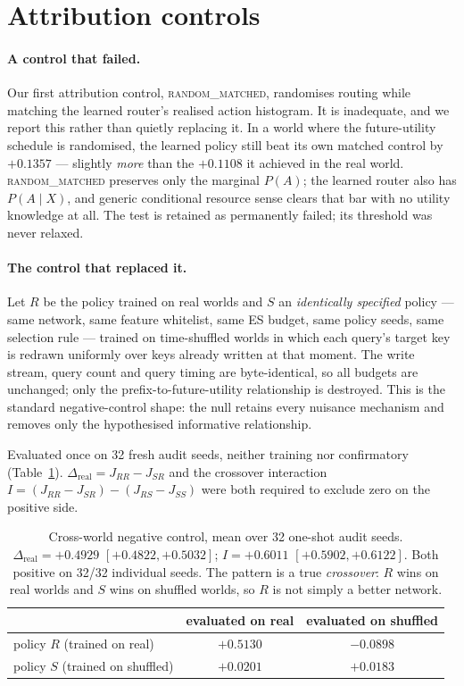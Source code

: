 \documentclass[11pt]{article}
\begin{document}
\section{Attribution controls}

\paragraph{A control that failed.} Our first attribution control,
\textsc{random\_matched}, randomises routing while matching the learned router's
realised action histogram. It is inadequate, and we report this rather than
quietly replacing it. In a world where the future-utility schedule is randomised,
the learned policy still beat its own matched control by $+0.1357$ --- slightly
\emph{more} than the $+0.1108$ it achieved in the real world. \textsc{random\_matched}
preserves only the marginal $P(A)$; the learned router also has $P(A \mid X)$,
and generic conditional resource sense clears that bar with no utility knowledge
at all. The test is retained as permanently failed; its threshold was never
relaxed.

\paragraph{The control that replaced it.} Let $R$ be the policy trained on real
worlds and $S$ an \emph{identically specified} policy --- same network, same
feature whitelist, same ES budget, same policy seeds, same selection rule ---
trained on time-shuffled worlds in which each query's target key is redrawn
uniformly over keys already written at that moment. The write stream, query
count and query timing are byte-identical, so all budgets are unchanged; only
the prefix-to-future-utility relationship is destroyed. This is the standard
negative-control shape: the null retains every nuisance mechanism and removes
only the hypothesised informative relationship.

Evaluated once on 32 fresh audit seeds, neither training nor confirmatory
(Table~\ref{tab:l5b}). $\Delta_{\text{real}} = J_{RR} - J_{SR}$ and the crossover
interaction $I = (J_{RR}-J_{SR}) - (J_{RS}-J_{SS})$ were both required to exclude
zero on the positive side.

\begin{table}[t]
\centering
\begin{tabular}{lcc}
\toprule
 & evaluated on real & evaluated on shuffled \\
\midrule
policy $R$ (trained on real) & $+0.5130$ & $-0.0898$ \\
policy $S$ (trained on shuffled) & $+0.0201$ & $+0.0183$ \\
\bottomrule
\end{tabular}
\caption{Cross-world negative control, mean over 32 one-shot audit seeds.
$\Delta_{\text{real}} = +0.4929$ $[+0.4822, +0.5032]$;
$I = +0.6011$ $[+0.5902, +0.6122]$. Both positive on 32/32 individual seeds.
The pattern is a true \emph{crossover}: $R$ wins on real worlds and $S$ wins on
shuffled worlds, so $R$ is not simply a better network.}
\label{tab:l5b}
\end{table}
\end{document}
